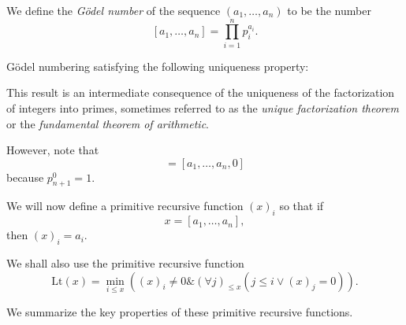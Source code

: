 \documentclass[12pt,a4paper,twoside,openany]{book}
\begin{document}
We define the \textit{G\"odel number} of the sequence $(a_1,\ldots,a_n)$ to be the number $$[a_1,\ldots,a_n]=\prod_{i=1}^np_i^{a_i}.$$

G\"odel numbering satisfying the following uniqueness property:

This result is an intermediate consequence of the uniqueness of the factorization of integers into primes, sometimes referred to as the \textit{unique factorization theorem} or the \textit{fundamental theorem of arithmetic}.

However, note that
\begin{equation}
    [a_1,\ldots,a_n]=[a_1,\ldots,a_n,0]
    \label{8.2}
\end{equation}
because $p_{n+1}^0=1$.

We will now define a primitive recursive function $(x)_i$ so that if $$x=[a_1,\ldots,a_n],$$ then $(x)_i=a_i$.

We shall also use the primitive recursive function $$\mathrm{Lt}(x)=\min_{i\leq x}((x)_i\neq0\&(\forall j)_{\leq x}(j\leq i\lor(x)_j=0)).$$

We summarize the key properties of these primitive recursive functions.


\end{document}
